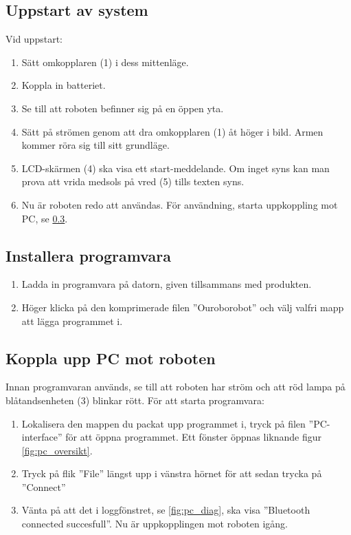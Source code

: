 \documentclass[a4paper,12pt]{article}
\begin{document}
\subsection{Uppstart av system}
Vid uppstart:
\begin{enumerate}
    \item Sätt omkopplaren (1) i dess mittenläge.
    \item Koppla in batteriet.
    \item Se till att roboten befinner sig på en öppen yta.
    \item Sätt på strömen genom att dra omkopplaren (1) åt höger i bild. Armen kommer röra sig till sitt grundläge.
    \item LCD-skärmen (4) ska visa ett start-meddelande. Om inget syns kan man prova att vrida medsols på vred (5) tills texten syns.
    \item  Nu är roboten redo att användas. För användning, starta uppkoppling mot PC, se \ref{subsec:start_pc}.
\end{enumerate}

\subsection{Installera programvara}
\label{subsec:install_pc}
\begin{enumerate}
    \item Ladda in programvara på datorn, given tillsammans med produkten.
    \item Höger klicka på den komprimerade filen ''Ouroborobot'' och välj valfri mapp att lägga programmet i.
\end{enumerate}


\subsection{Koppla upp PC mot roboten}
\label{subsec:start_pc}
Innan programvaran används, se till att roboten har ström och att röd lampa på blåtandsenheten (3) blinkar rött. För att starta programvara:
\begin{enumerate}
    \item Lokalisera den mappen du packat upp programmet i, tryck på filen ''PC-interface'' för att öppna programmet.  Ett fönster öppnas liknande figur \ref{fig:pc_oversikt}. 
    \item Tryck på flik ''File''  längst upp i vänstra hörnet för att sedan trycka på ''Connect''
    \item Vänta på att det i loggfönstret, se \ref{fig:pc_diag}, ska visa ''Bluetooth connected succesfull''. Nu är uppkopplingen mot roboten igång. 
\end{enumerate}
\end{document}
